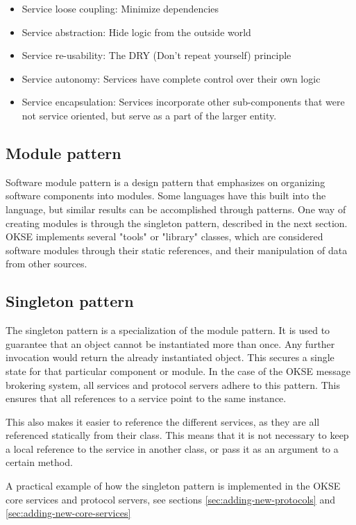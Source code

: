\begin{itemize}
\item Service loose coupling: Minimize dependencies
\item Service abstraction: Hide logic from the outside world
\item Service re-usability: The DRY (Don't repeat yourself) principle
\item Service autonomy: Services have complete control over their own logic
\item Service encapsulation: Services incorporate other sub-components that were not service oriented, but serve as a part of the larger entity.
\end{itemize}

\subsection{Module pattern}

Software module pattern is a design pattern that emphasizes on organizing software components into modules. Some languages have this built into the language, but similar results can be accomplished through patterns. One way of creating modules is through the singleton pattern, described in the next section. OKSE implements several "tools" or "library" classes, which are considered software modules through their static references, and their manipulation of data from other sources.

\subsection{Singleton pattern}

The singleton pattern is a specialization of the module pattern. It is used to guarantee that an object cannot be instantiated more than once. Any further invocation would return the already instantiated object. This secures a single state for that particular component or module. In the case of the OKSE message brokering system, all services and protocol servers adhere to this pattern. This ensures that all references to a service point to the same instance.

This also makes it easier to reference the different services, as they are all referenced statically from their class. This means that it is not necessary to keep a local reference to the service in another class, or pass it as an argument to a certain method.

A practical example of how the singleton pattern is implemented in the OKSE core services and protocol servers, see sections \ref{sec:adding-new-protocols} and \ref{sec:adding-new-core-services}


